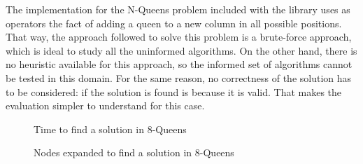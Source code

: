 The implementation for the N-Queens problem included with the library uses as
operators the fact of adding a queen to a new column in all possible positions.
That way, the approach followed to solve this problem is a brute-force
approach, which is ideal to study all the uninformed algorithms. On the other
hand, there is no heuristic available for this approach, so the informed set of
algorithms cannot be tested in this domain. For the same reason, no correctness
of the solution has to be considered: if the solution is found is because it is
valid. That makes the evaluation simpler to understand for this case.\\

\begin{figure}[!htbp]
  \centering
  \caption{Time to find a solution in 8-Queens}
  \label{nq:time}
\end{figure}


\begin{figure}[!htbp]
  \centering
  \caption{Nodes expanded to find a solution in 8-Queens}
  \label{nq:nodes}
\end{figure}


